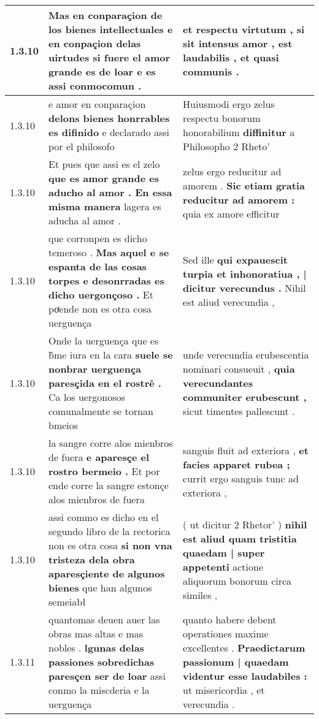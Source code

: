 \begin{tabular}{|p{1cm}|p{6.5cm}|p{6.5cm}|}
1.3.10 & Mas en conparaçion de los bienes intellectuales e en conpaçion delas uirtudes \textbf{ si fuere el amor grande es de loar } e es assi conmocomun . & et respectu virtutum , \textbf{ si sit intensus amor , } est laudabilis , et quasi communis . \\\hline
1.3.10 & e amor en conparaçion \textbf{ delons bienes honrrables es difinido } e declarado assi por el philosofo & Huiusmodi ergo zelus respectu bonorum honorabilium \textbf{ diffinitur } a Philosopho 2 Rheto’ \\\hline
1.3.10 & Et pues que assi es el zelo \textbf{ que es amor grande es aducho al amor . En essa misma manera } lagera es aducha al amor . & zelus ergo reducitur ad amorem . \textbf{ Sic etiam gratia reducitur ad amorem : } quia ex amore efficitur \\\hline
1.3.10 & que corronpen es dicho temeroso . \textbf{ Mas aquel e se espanta de las cosas torpes e desonrradas es dicho uergonçoso . } Et poͬende non es otra cosa uerguença & Sed ille \textbf{ qui expauescit turpia et inhonoratiua , | dicitur verecundus . } Nihil est aliud verecundia , \\\hline
1.3.10 & Onde la uerguença que es b̃me iura en la cara \textbf{ suele se nonbrar uerguença paresçida en el rostre̊ . } Ca los uergonosos comunalmente se tornan bmeios & unde verecundia erubescentia nominari consueuit , \textbf{ quia verecundantes communiter erubescunt , } sicut timentes pallescunt . \\\hline
1.3.10 & la sangre corre alos mienbros de fuera \textbf{ e aparesçe el rostro bermeio . } Et por ende corre la sangre estonçe alos mienbros de fuera & sanguis fluit ad exteriora , \textbf{ et facies apparet rubea ; } currit ergo sanguis tunc ad exteriora , \\\hline
1.3.10 & assi commo es dicho en el segundo libro de la rectorica non es otra cosa \textbf{ si non vna tristeza dela obra aparesçiente de algunos bienes } que han algunos semeiabł & ( ut dicitur 2 Rhetor’ ) \textbf{ nihil est aliud quam tristitia quaedam | super appetenti } actione aliquorum bonorum circa similes , \\\hline
1.3.11 & quantomas deuen auer las obras mas altas e mas nobles . \textbf{ lgunas delas passiones sobredichas paresçen ser de loar } assi conmo la miscderia e la uerguença & quanto habere debent operationes maxime excellentes . \textbf{ Praedictarum passionum | quaedam videntur esse laudabiles : } ut misericordia , et verecundia . \\\hline

\end{tabular}
